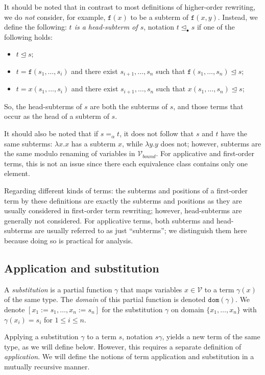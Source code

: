 \documentclass{lmcs}
\theoremstyle{theorem}\newtheorem{theorem}[dummy]{Theorem}
\theoremstyle{theorem}\newtheorem{lemma}[dummy]{Lemma}
\theoremstyle{theorem}\newtheorem{corollary}[dummy]{Corollary}
\theoremstyle{definition}\newtheorem{definition}[dummy]{Definition}
\theoremstyle{definition}\newtheorem{example}[dummy]{Example}
\newcommand{\V}{\mathcal{V}}
\newcommand{\Vbound}{\mathcal{V}_{\mathit{bound}}}
\newcommand{\domain}{\mathtt{dom}}
\newcommand{\identifier}[1]{\mathtt{#1}}
\newcommand{\afun}{\identifier{f}}
\newcommand{\avar}{x}
\newcommand{\abs}[2]{\lambda #1.#2}
\newcommand{\subtermeq}{\unlhd}
\newcommand{\headsubtermeq}{\unlhd_{\bullet}}
\begin{document}
It should be noted that in contrast to most definitions of higher-order rewriting, we do \emph{not}
consider, for example, $\afun(x)$ to be a subterm of $\afun(x,y)$.  Instead, we define the
following: \emph{$t$ is a head-subterm of $s$}, notation $t \headsubtermeq s$ if one of the
following holds:
\begin{itemize}
\item $t \subtermeq s$;
\item $t = \afun(s_1,\dots,s_i)$ and there exist $s_{i+1},\dots,s_n$ such that
  $\afun(s_1,\dots,s_n) \subtermeq s$;
\item $t = \avar(s_1,\dots,s_i)$ and there exist $s_{i+1},\dots,s_n$ such that
  $\avar(s_1,\dots,s_n) \subtermeq s$;
\end{itemize}
So, the head-subterms of $s$ are both the subterms of $s$, and those terms that occur as the head
of a subterm of $s$.

It should also be noted that if $s =_\alpha t$, it does not follow that $s$ and $t$ have the same
subterms: $\abs{x}{x}$ has a subterm $x$, while $\abs{y}{y}$ does not; however, subterms are the
same modulo renaming of variables in $\Vbound$.  For applicative and
first-order terms, this is not an issue since there each equivalence class contains only one
element.

Regarding different kinds of terms: the subterms and positions of a first-order term by these
definitions are exactly the subterms and positions as they are usually considered in first-order
term rewriting; however, head-subterms are generally not considered.  For applicative terms,
both subterms and head-subterms are usually referred to as just ``subterms''; we distinguish them
here because doing so is practical for analysis.

\subsection{Application and substitution}

A \emph{substitution} is a partial function $\gamma$ that maps variables $\avar \in \V$ to a term
$\gamma(\avar)$ of the same type.  The \emph{domain} of this partial function is denoted
$\domain(\gamma)$.
We denote $[\avar_1:=s_1,\dots,\avar_n:=s_n]$ for the substitution $\gamma$ on domain $\{\avar_1,
\dots,\avar_n\}$ with $\gamma(x_i) = s_i$ for $1 \leq i \leq n$.

Applying a substitution $\gamma$ to a term $s$, notation $s\gamma$, yields a new term of the same
type, as we will define below. However, this requires a separate definition of \emph{application}.
We will define the notions of term application and substitution in a mutually recursive manner.
\end{document}
